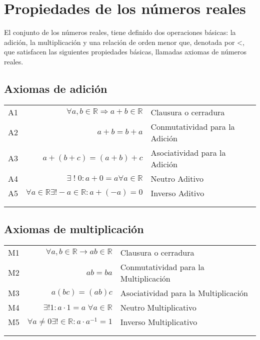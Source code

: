 \chapter{Propiedades de los números reales}
El conjunto de los números reales, tiene definido dos operaciones básicas: la adición, la multiplicación y una relación de orden menor que, denotada por <, que satisfacen las siguientes propiedades básicas, llamadas axiomas de números reales.\\

\section{Axiomas de adición}
\begin{center}
\begin{tabular}{c r l}
A1&$\forall a,b \in \mathbb{R} \Rightarrow a+b\in \mathbb{R}$&Clausura o cerradura \\ \label{A1}
A2&$a+b=b+a$&Conmutatividad para la Adición\\ \label{A2}
A3&$a+(b+c)=(a+b)+c$&Asociatividad para la Adición\\ \label{A3}
A4&$\exists \; ! \; 0: a+0=a \forall a \in \mathbb{R} $&Neutro Aditivo\\ \label{A4}
A5&$\forall a \in \mathbb{R} \exists ! -a\in \mathbb{R}: a+ (-a)=0$&Inverso Aditivo\\\\ \label{A5}
\end{tabular}
\end{center}
\section{Axiomas de multiplicación}
\begin{center}
\begin{tabular}{c r l}
M1&$\forall a, b \in \mathbb{R} \rightarrow ab \in \mathbb{R}$&Clausura o cerradura\\ \label{M1}
M2&$ab=ba$&Conmutatividad para la Multiplicación\\ \label{M2}
M3&$a(bc)=(ab)c$&Asociatividad para la Multiplicación\\ \label{M3}
M4&$\exists ! 1 : a\cdot 1=a \; \forall a \in \mathbb{R}$&Neutro Multiplicativo\\ \label{M4}
M5&$\forall a \neq 0 \exists ! \in \mathbb{R}: a\cdot a^{-1}=1$&Inverso Multiplicativo\\\\ \label{M5}
\end{tabular}
\end{center}
